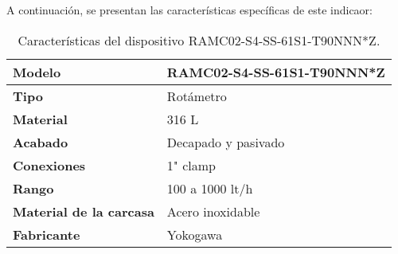 A continuación, se presentan las características específicas de este indicaor:\\



\begin{table}[H]
    \centering
    \caption{Características del dispositivo RAMC02-S4-SS-61S1-T90NNN*Z.}
    \label{table:indicador_flujo}
    \begin{tabular}{| L{6cm} | L{6cm} |}
        
        \hline
        \textbf{Modelo} & RAMC02-S4-SS-61S1-T90NNN*Z  \\
        \hline
        \textbf{Tipo} & Rotámetro  \\
        \hline
        \textbf{Material} & 316 L  \\
        \hline
        \textbf{Acabado} & Decapado y pasivado  \\
        \hline
        \textbf{Conexiones} & 1" clamp  \\
        \hline
        \textbf{Rango} & 100 a 1000 lt/h  \\
        \hline
        \textbf{Material de la carcasa} & Acero inoxidable  \\
        \hline
        \textbf{Fabricante} & Yokogawa  \\
        \hline
    \end{tabular}
\end{table}

